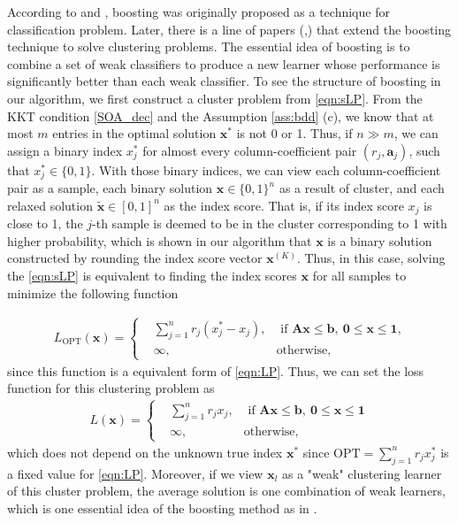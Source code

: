 \documentclass{article} %
\begin{document}
According to \cite{friedman2001elements} and \cite{shalev2014understanding}, boosting was originally proposed as a technique for classification problem. Later, there is a line of papers (\cite{frossyniotis2004clustering},\cite{okabe2018clustering}) that extend the boosting technique to solve clustering problems. The essential idea of boosting is to combine a set of weak classifiers to produce a new learner whose performance is significantly better than each weak classifier. To see the structure of boosting in our algorithm, we first construct a cluster problem from \eqref{eqn:sLP}. From the KKT condition \eqref{SOA_dec} and the Assumption \ref{ass:bdd} (c), we know that at most $m$ entries in the optimal solution $\bm{x}^*$ is not 0 or 1. Thus, if $n\gg m$, we can assign a binary index $x^*_j$ for almost every column-coefficient pair $(r_j,\bm{a}_j)$, such that $x^*_j\in\{0,1\}$. With those binary indices, we can view each column-coefficient pair as a sample, each binary solution $\bm{x}\in\{0,1\}^{n}$ as a result of cluster, and each relaxed solution $\tilde{\bm{x}}\in[0,1]^{n}$ as the index score. That is, if its index score $x_j$ is close to 1, the $j$-th sample is deemed to be in the cluster corresponding to 1 with higher probability, which is shown in our algorithm that $\bm{x}$ is a binary solution constructed by rounding the index score vector $\bm{x}^{(K)}$. Thus, in this case, solving the \eqref{eqn:sLP} is equivalent to finding the index scores $\bm{x}$ for all samples to minimize the following function

 \begin{align*}
    L_{\text{OPT}}(\bm{x})
    =
    \left\{
    \begin{matrix}
        &\sum\limits_{j=1}^{n}r_j(x_j^*-x_j), & \text{ if $\bm{A}\bm{x}\leq\bm{b},\ \bm{0}\leq\bm{x}\leq\bm{1}$,}\\
        &\infty, & \text{otherwise,}    
    \end{matrix}
    \right.   
 \end{align*}
 since this function is a equivalent form of \eqref{eqn:LP}. Thus, we can set the loss function for this clustering problem as 
 \begin{align*}
    L(\bm{x})
    =
    \left\{
    \begin{matrix}
        &\sum\limits_{j=1}^{n}r_jx_j, & \text{ if $\bm{A}\bm{x}\leq\bm{b},\ \bm{0}\leq\bm{x}\leq\bm{1}$}\\
        &\infty, & \text{otherwise,}    
    \end{matrix}
    \right.   
 \end{align*}
 which does not depend on the unknown true index $\bm{x}^*$ since $\text{OPT}=\sum\limits_{j=1}^{n}r_jx_j^*$ is a fixed value for \eqref{eqn:LP}. Moreover, if we view $\bm{x}_l$ as a "weak" clustering learner of this cluster problem, the average solution is one combination of weak learners, which is one essential idea of the boosting method as in \cite{friedman2001elements}. 
\end{document}

